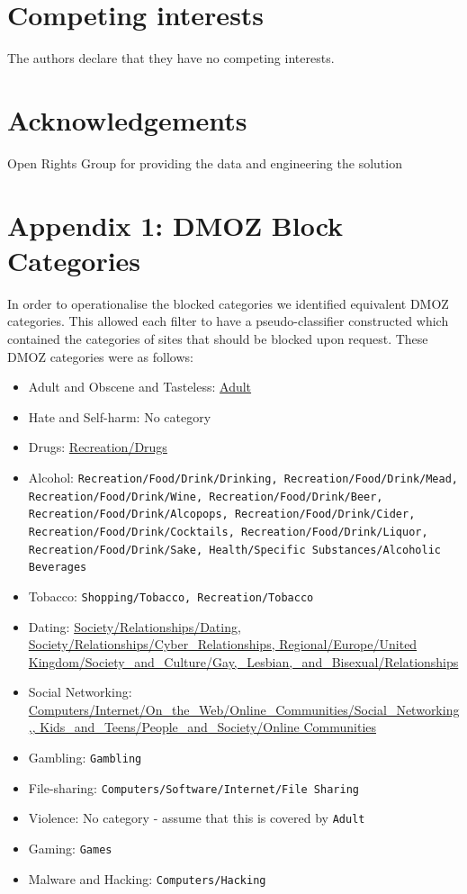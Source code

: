 \documentclass{bmcart}
\begin{document}
\begin{backmatter}

\section*{Competing interests}
  The authors declare that they have no competing interests.

\section*{Acknowledgements}
Open Rights Group for providing the data and engineering the solution


\section*{Appendix 1: DMOZ Block Categories}
\label{app:cats}
In order to operationalise the blocked categories we identified equivalent DMOZ categories.
This allowed each filter to have a pseudo-classifier constructed which contained the categories of sites that should be blocked upon request.
These DMOZ categories were as follows:

\begin{itemize}
	\item Adult and Obscene and Tasteless: \url{Adult}
	\item Hate and Self-harm: No category
	\item Drugs: \url{Recreation/Drugs}
	\item Alcohol: \texttt{Recreation/Food/Drink/Drinking, Recreation/Food/Drink/Mead, Recreation/Food/Drink/Wine, Recreation/Food/Drink/Beer, Recreation/Food/Drink/Alcopops, Recreation/Food/Drink/Cider, Recreation/Food/Drink/Cocktails, Recreation/Food/Drink/Liquor, Recreation/Food/Drink/Sake, Health/Specific Substances/Alcoholic Beverages}
	\item Tobacco: \texttt{Shopping/Tobacco, Recreation/Tobacco}
	\item Dating: \url{Society/Relationships/Dating, Society/Relationships/Cyber_Relationships, Regional/Europe/United Kingdom/Society_and_Culture/Gay,_Lesbian,_and_Bisexual/Relationships}
	\item Social Networking: \url{Computers/Internet/On_the_Web/Online_Communities/Social_Networking,, Kids_and_Teens/People_and_Society/Online Communities}
	\item Gambling: \texttt{Gambling}
	\item File-sharing: \texttt{Computers/Software/Internet/File Sharing}
	\item Violence: No category - assume that this is covered by \texttt{Adult}
	\item Gaming: \texttt{Games}
	\item Malware and Hacking: \texttt{Computers/Hacking}
\end{itemize}

\end{backmatter}
\end{document}
